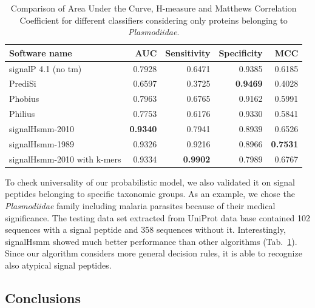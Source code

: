 \documentclass[fleqn,10pt,twoside]{gcb15submission}
\begin{document}
\begin{table}[ht]
\small
\centering
\caption{Comparison of Area Under the Curve, H-measure and Matthews Correlation Coefficient for different classifiers considering only proteins belonging to \textsl{Plasmodiidae}.} 
\begin{tabular}{lrrrr}
  \toprule
Software name & AUC & Sensitivity & Specificity & MCC \\ 
  \midrule
signalP 4.1 (no tm) \citep{2011petersensignalp} & 0.7928 & 0.6471 & 0.9385 & 0.6185 \\ 
   \rowcolor[gray]{0.85}PrediSi \citep{2004hillerpredisi} & 0.6597 & 0.3725 & \textbf{0.9469} & 0.4028 \\ 
  Phobius \citep{2004klla} & 0.7963 & 0.6765 & 0.9162 & 0.5991 \\ 
   \rowcolor[gray]{0.85}Philius \citep{2008reynoldstransmembrane} & 0.7753 & 0.6176 & 0.9330 & 0.5841 \\ 
  signalHsmm-2010 & \textbf{0.9340} & 0.7941 & 0.8939 & 0.6526 \\ 
   \rowcolor[gray]{0.85}signalHsmm-1989 & 0.9326 & 0.9216 & 0.8966 & \textbf{0.7531} \\ 
  signalHsmm-2010 with k-mers & 0.9334 & \textbf{0.9902} & 0.7989 & 0.6767 \\ 
   \bottomrule
\end{tabular}
\label{tab:bench2010plas}
\end{table}

To check universality of our probabilistic model, we also validated it on signal peptides belonging to specific taxonomic groups. As an example, we chose the \textsl{Plasmodiidae} family including malaria parasites because of their medical significance. The testing data set extracted from UniProt data base contained 102 sequences with a signal peptide and 358 sequences without it. Interestingly, signalHsmm showed much better performance than other algorithms (Tab.~\ref{tab:bench2010plas}). Since our algorithm considers more general decision rules, it is able to recognize also atypical signal peptides.


\subsection*{Conclusions}
\end{document}
